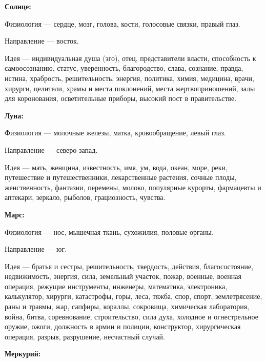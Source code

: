 \begin{myenum}[topsep=0]
	\item \textbf{Солнце:}
		\begin{mydescr}
			\item[Физиология] --- сердце, мозг, голова, кости, голосовые связки, правый глаз.
			\item[Направление] --- восток.
			\item[Идея] --- индивидуальная душа (эго), отец, представители власти, способность к самоосознанию, статус, уверенность, благородство, слава, сознание, правда, истина, храбрость, решительность, энергия, политика, химия, медицина, врачи, хирурги, целители, храмы и места поклонений, места жертвоприношений, залы для коронования, осветительные приборы, высокий пост в правительстве.
		\end{mydescr}
	\item \textbf{Луна:}
		\begin{mydescr}
			\item[Физиология] --- молочные железы, матка, кровообращение, левый глаз.
			\item[Направление] --- северо-запад.
			\item[Идея] --- мать, женщина, известность, имя, ум, вода, океан, море, реки, путешествие и путешественники, лекарственные растения, сочные плоды, женственность, фантазии, перемены, молоко, популярные курорты, фармацевты и аптекари, зеркало, рыболов, грациозность, чувства.
		\end{mydescr}
	\item \textbf{Марс:}
		\begin{mydescr}
			\item[Физиология] --- нос, мышечная ткань, сухожилия, половые органы.
			\item[Направление] --- юг.
			\item[Идея] --- братья и сестры, решительность, твердость, действия, благосостояние, недвижимость, энергия, сила, земельный участок, пожар, военные, военная операция, режущие инструменты, инженеры, математика, электроника, калькулятор, хирурги, катастрофы, горы, леса, тяжба, спор, спорт, землетрясение, раны и травмы, жар, сапфиры, кораллы, сокровища, химическая лаборатория, война, битва, соревнование, строительство, сила духа, холодное и огнестрельное оружие, ожоги, должность в армии и полиции, конструктор, хирургическая операция, разрыв, разрушение, несчастный случай.
		\end{mydescr}
	\item \textbf{Меркурий:}

\end{myenum}

